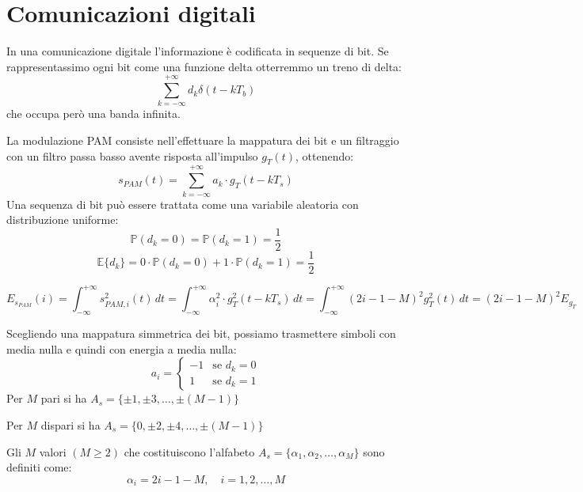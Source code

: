 
\section*{Comunicazioni digitali}

\begin{adjustwidth*}{-2.3cm}{-2cm}
    \begin{center}
        
    \end{center}
\end{adjustwidth*}


In una comunicazione digitale l'informazione è codificata in sequenze di bit. Se rappresentassimo ogni bit come una funzione delta otterremmo un treno di delta:
\[
    \sum_{k=-\infty}^{+\infty} d_k \delta(t - kT_b)
\]
che occupa però una banda infinita.

La modulazione PAM consiste nell'effettuare la mappatura dei bit e un filtraggio con un filtro passa basso avente risposta all'impulso \( g_T(t) \), ottenendo:
\[ s_{PAM}(t) = \sum_{k=-\infty}^{+\infty} a_k\cdot g_T(t - kT_s) \]
Una sequenza di bit può essere trattata come una variabile aleatoria con distribuzione uniforme:
\[
    \mathbb{P}(d_k = 0) = \mathbb{P}(d_k = 1) = \frac{1}{2}
\]
\[
    \mathbb{E}\{d_k\} = 0\cdot \mathbb{P}(d_k = 0) + 1\cdot \mathbb{P}(d_k = 1) = \frac{1}{2}
\]

\[
    E_{s_{PAM}}(i) = \int_{-\infty}^{+\infty} s_{PAM, i}^2(t) \, dt =  \int_{-\infty}^{+\infty} \alpha_i^2 \cdot g_T^2(t - kT_s) \, dt = \int_{-\infty}^{+\infty} (2i - 1 - M)^2 g_T^2(t) \, dt = (2i - 1 - M)^2 E_{g_T}
\]

Scegliendo una mappatura simmetrica dei bit, possiamo trasmettere simboli con media nulla e quindi con energia a media nulla:
\[
    a_i =
    \begin{cases}
        -1 & \text{se } d_k = 0 \\
        1  & \text{se } d_k = 1
    \end{cases}
\]
Per \( M \) pari si ha \( A_s = \{ \pm 1, \pm 3, \ldots, \pm (M-1) \} \)

Per \( M \) dispari si ha \( A_s = \{ 0, \pm 2, \pm 4, \ldots, \pm (M-1) \} \)


Gli \( M \) valori \( (M \geq 2) \) che costituiscono l'alfabeto \( A_s = \{ \alpha_1, \alpha_2, \ldots, \alpha_M \} \) sono definiti come:
\[ \alpha_i = 2i - 1 - M, \quad i = 1, 2, \ldots, M \]




